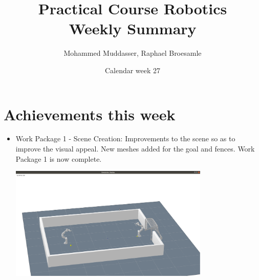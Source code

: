 \documentclass[12pt,pdftex,a4paper]{article}
\begin{document}
\title{Practical Course Robotics\\Weekly Summary}
\author{Mohammed Muddasser, Raphael Broesamle}
\date{Calendar week 27}
\maketitle

\section*{Achievements this week}
\begin{itemize}
\item
Work Package 1 - Scene Creation:
Improvements to the scene so as to improve the visual appeal. New meshes added for the goal and fences. Work Package 1 is now complete.
\\
\begin{enumerate}
    \begin{minipage}{\linewidth}
        \centering
        \includegraphics[width=0.75\textwidth]{environment.png}
        \captionof{\\Scene}
    \end{minipage}
\end{enumerate}


\end{itemize}
\end{document}
